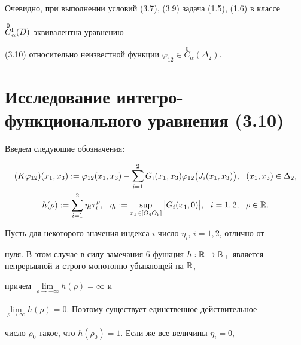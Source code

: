 \begin{note}


Очевидно, при выполнении условий (3.7), (3.9) задача (1.5), (1.6) в классе


$\overset{0}{C}{}_{\alpha}^{\bold{l}}(\overline D)$ эквивалентна уравнению


(3.10) относительно неизвестной функции $\varphi_{12}\in


\overset{0}{C}_{\alpha}(\Delta_2)$.


\end{note}








\section{Исследование интегро-функционального уравнения (3.10)}





Введем следующие обозначения:




\begin{gather}


(K\varphi_{12})(x_1,x_3):=\varphi_{12}(x_1,x_3) - \sum_{i=1}^{2}G_i(x_1,x_3)


\varphi_{12} \big (J_i(x_1,x_3) \big ),\ \ (x_1,x_3)\in \Delta_2,\\


h(\rho):=\sum_{i=1}^{2} \eta_i \tau_i^{\rho},


\ \ \eta_i:=\sup_{x_1 \in


[O_4 O_6]}\big |G_i(x_1,0) \big |,\ \ i=1,2,\ \ \rho \in\Bbb{R}.


\end{gather}


Пусть для некоторого значения индекса $i$ число $\eta_i$, $i=1,2$, отлично от


нуля. В этом случае в силу замечания 6 функция $h:\Bbb{R}\to


{\Bbb{R}}_{+}$ является непрерывной и строго монотонно убывающей на $\Bbb{R}$,


причем $\lim\limits_{\rho \to - \infty}h(\rho)=\infty$ и


$\lim\limits_{\rho


\to \infty}h(\rho)=0$. Поэтому существует единственное действительное


число $\rho_0$ такое, что $h(\rho_0)=1$. Если же все величины $\eta_i=0$,


